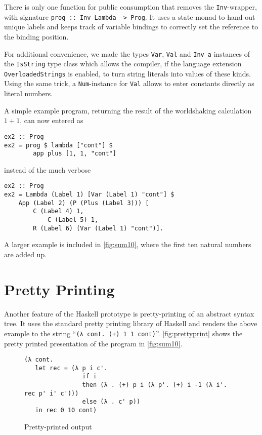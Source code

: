 \documentclass[a4paper,parskip=half,BCOR=8mm,DIV=calc,12pt]{scrbook}
\begin{document}
There is only one function for public consumption that removes the \lstinline-Inv--wrapper, with signature \lstinline!prog :: Inv Lambda -> Prog!. It uses a state monad to hand out unique labels and keeps track of variable bindings to correctly set the reference to the binding position. 

For additional convenience, we made the types \lstinline!Var!, \lstinline!Val! and \lstinline!Inv a! instances of the \lstinline!IsString! type class which allows the compiler, if the language extension \lstinline!OverloadedStrings! is enabled, to turn string literals into values of these kinds. Using the same trick, a \lstinline!Num!-instance for \lstinline!Val! allows to enter constants directly as literal numbers.

A simple example program, returning the result of the worldshaking calculation $1 + 1$, can now entered as
\begin{lstlisting}
ex2 :: Prog
ex2 = prog $ lambda ["cont"] $ 
        app plus [1, 1, "cont"]
\end{lstlisting}
instead of the much verbose
\begin{lstlisting}
ex2 :: Prog
ex2 = Lambda (Label 1) [Var (Label 1) "cont"] $
	App (Label 2) (P (Plus (Label 3))) [
		C (Label 4) 1,
	        C (Label 5) 1,
		R (Label 6) (Var (Label 1) "cont")].
\end{lstlisting}
A larger example is included in \vref{fig:sum10}, where the first ten natural numbers are added up.

\section{Pretty Printing}

Another feature of the Haskell prototype is pretty-printing of an abstract syntax tree. It uses the standard pretty printing library of Haskell \cite{pretty} and renders the above example to the string “\texttt{(λ\ cont.\ (+)\ 1\ 1\ cont)}”. \vref{fig:prettyprint} shows the pretty printed presentation of the program in \vref{fig:sum10}.

\begin{figure}
\centering
\begin{framed}
\footnotesize
\begin{verbatim}
(λ cont.
   let rec = (λ p i c'.
                if i
                then (λ . (+) p i (λ p'. (+) i -1 (λ i'. rec p' i' c')))
                else (λ . c' p))
   in rec 0 10 cont)
\end{verbatim}
\end{framed}
\caption{Pretty-printed output}
\label{fig:prettyprint}
\end{figure}
\end{document}
